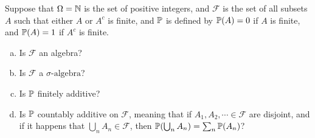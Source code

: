 \begin{problem}
	Suppose that $ \Omega = \mathbb{N}  $ is the set of positive integers, and $ \mathcal{F} $ is the set of all subsets $ A $ such that either $ A $ or $ A^c $ is finite, and $ \mathbb{P} $ is defined by $ \mathbb{P}(A) = 0 $ if $ A $ is finite, and $ \mathbb{P}(A) = 1 $ if $ A^c $ is finite. 
	\begin{enumerate}[(a)]
		\item Is $ \mathcal{F} $ an algebra?
		\item Is $ \mathcal{F} $ a $\sigma\text{-algebra}$?
		\item Is $ \mathbb{P} $ finitely additive?
		\item Is $ \mathbb{P} $ countably additive on $ \mathcal{F} $, meaning that if $ A_1,A_2,\cdots \in \mathcal{F} $ are disjoint, and if it happens that $ \bigcup_n A_n \in \mathcal{F} $, then $ \mathbb{P}(\bigcup_n A_n) = \sum_n \mathbb{P}(A_n) $?
	\end{enumerate}
\end{problem}
